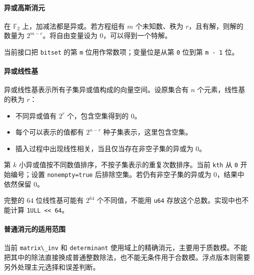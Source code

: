 \hypertarget{ux5f02ux6216ux9ad8ux65afux6d88ux5143}{%
\paragraph{异或高斯消元}\label{ux5f02ux6216ux9ad8ux65afux6d88ux5143}}

在 \(\mathbb F_2\) 上，加减法都是异或。若方程组有 \(m\) 个未知数、秩为 \(r\)，且有解，则解的数量为 \(2^{m-r}\)。将自由变量设为 \(0\)，可以得到一个特解。

当前接口把 \passthrough{\lstinline!bitset!} 的第 \passthrough{\lstinline!m!} 位用作常数项；变量位是从第 \passthrough{\lstinline!0!} 位到第 \passthrough{\lstinline!m - 1!} 位。

\hypertarget{ux5f02ux6216ux7ebfux6027ux57fa}{%
\paragraph{异或线性基}\label{ux5f02ux6216ux7ebfux6027ux57fa}}

异或线性基表示所有子集异或值构成的向量空间。设原集合有 \(n\) 个元素，线性基的秩为 \(r\)：

\begin{itemize}
\tightlist
\item
  不同异或值有 \(2^r\) 个，包含空集得到的 \(0\)。
\item
  每个可以表示的值都有 \(2^{n-r}\) 种子集表示，这里包含空集。
\item
  插入过程中出现线性相关，当且仅当存在非空子集的异或为 \(0\)。
\end{itemize}

第 \(k\) 小异或值按不同数值排序，不按子集表示的重复次数排序。当前 \passthrough{\lstinline!kth!} 从 \passthrough{\lstinline!0!} 开始编号；设置 \passthrough{\lstinline!nonempty=true!} 后排除空集。若仍有非空子集的异或为 \(0\)，结果中依然保留 \(0\)。

完整的 \(64\) 位线性基可能有 \(2^{64}\) 个不同值，不能用 \passthrough{\lstinline!u64!} 存放这个总数。实现中也不能计算 \passthrough{\lstinline!1ULL << 64!}。

\hypertarget{ux666eux901aux6d88ux5143ux7684ux9002ux7528ux8303ux56f4}{%
\paragraph{普通消元的适用范围}\label{ux666eux901aux6d88ux5143ux7684ux9002ux7528ux8303ux56f4}}

当前 \passthrough{\lstinline!matrix\_inv!} 和 \passthrough{\lstinline!determinant!} 使用域上的精确消元，主要用于质数模。不能把其中的除法直接换成普通整数除法，也不能无条件用于合数模。浮点版本则需要另外处理主元选择和误差判断。

